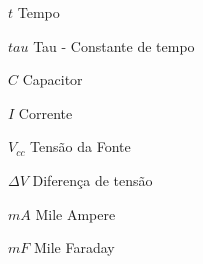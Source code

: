 \begin{simbolos}
  \item[$t$] Tempo
  \item[$tau$] Tau - Constante de tempo
  \item[$C$] Capacitor
  \item[$I$] Corrente
  \item[$V_{cc}$] Tensão da Fonte
  \item[$\Delta V$] Diferença de tensão
  \item[$mA$] Mile Ampere
  \item[$mF$] Mile Faraday
\end{simbolos}

\tableofcontents*
\cleardoublepage
